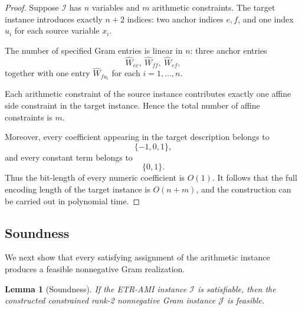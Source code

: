 \documentclass[11pt]{article}
\newtheorem{lemma}[theorem]{Lemma}
\begin{document}
\begin{proof}
Suppose \(\mathcal{I}\) has \(n\) variables and \(m\) arithmetic constraints.
The target instance introduces exactly \(n+2\) indices: two anchor indices
\(e,f\), and one index \(u_i\) for each source variable \(x_i\).

The number of specified Gram entries is linear in \(n\): three anchor entries
\[
\widehat{W}_{ee},\ \widehat{W}_{ff},\ \widehat{W}_{ef},
\]
together with one entry \(\widehat{W}_{f u_i}\) for each \(i=1,\dots,n\).

Each arithmetic constraint of the source instance contributes exactly one
affine side constraint in the target instance. Hence the total number of
affine constraints is \(m\).

Moreover, every coefficient appearing in the target description belongs to
\[
\{-1,0,1\},
\]
and every constant term belongs to
\[
\{0,1\}.
\]
Thus the bit-length of every numeric coefficient is \(O(1)\). It follows that
the full encoding length of the target instance is \(O(n+m)\), and the
construction can be carried out in polynomial time.
\end{proof}

\subsection{Soundness}
\label{subsec:soundness}

We next show that every satisfying assignment of the arithmetic instance
produces a feasible nonnegative Gram realization.

\begin{lemma}[Soundness]
\label{lem:soundness}
If the \textsc{ETR-AMI} instance \(\mathcal{I}\) is satisfiable, then the
constructed constrained rank-2 nonnegative Gram instance \(\mathcal{J}\) is
feasible.
\end{lemma}
\end{document}
